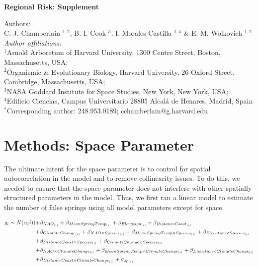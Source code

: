 \documentclass{article}\usepackage[]{graphicx}\usepackage[]{color}
\begin{document}
\noindent \textbf{\Large{Regional Risk: Supplement}}

\noindent Authors:\\
C. J. Chamberlain $^{1,2}$, B. I. Cook $^{3}$, I. Morales Castilla $^{1,4}$ \& E. M. Wolkovich $^{1,2}$
\vspace{2ex}\\
\emph{Author affiliations:}\\
$^{1}$Arnold Arboretum of Harvard University, 1300 Centre Street, Boston, Massachusetts, USA; \\
$^{2}$Organismic \& Evolutionary Biology, Harvard University, 26 Oxford Street, Cambridge, Massachusetts, USA; \\
$^{3}$NASA Goddard Institute for Space Studies, New York, New York, USA; \\
$^{4}$Edificio Ciencias, Campus Universitario 28805 Alcalá de Henares, Madrid, Spain \\
\vspace{2ex}
$^*$Corresponding author: 248.953.0189; cchamberlain@g.harvard.edu\\

\renewcommand{\thetable}{\arabic{table}}
\renewcommand{\thefigure}{\arabic{figure}}
\renewcommand{\labelitemi}{$-$}

\section*{Methods: Space Parameter}
The ultimate intent for the space parameter is to control for spatial autocorrelation in the model and to remove collinearity issues. To do this, we needed to ensure that the space parameter does not interfere with other spatially-structured parameters in the model. Thus, we first ran a linear model to estimate the number of false springs using all model parameters except for space. 

\begin{align*} \label{eq:s1} 
y_i \thicksim N(\alpha_(i)) +&  \beta_{NAO_{(i)}} + \beta_{MeanSpringTemp_{(i)}} + \beta_{Elevation_{(i)}} + \beta_{DistanceCoast_{(i)}} \\ +& \beta_{ClimateChange_{(i)}}
+ \beta_{NAO \times Species_{(i)}} + \beta_{MeanSpringTemp \times Species_{(i)}} + \beta_{Elevation \times Species_{(i)}} \\ +& \beta_{DistanceCoast \times Species_{(i)}} + \beta_{ClimateChange \times Species_{(i)}} \\
+& \beta_{NAO \times ClimateChange_{(i)}} + \beta_{MeanSpringTemp \times ClimateChange_{(i)}} 
+ \beta_{Elevation \times ClimateChange_{(i)}} \\ +& \beta_{DistanceCoast \times ClimateChange_{(i)}} + \sigma_{sp_{(i)}} 
\end{align*}
\end{document}
